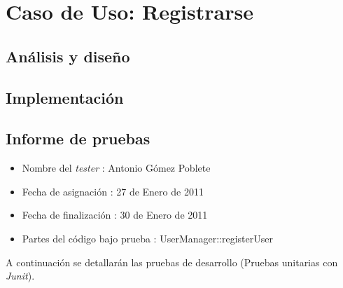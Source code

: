 \section{Caso de Uso: Registrarse}

\subsection*{Análisis y diseño}

\subsection*{Implementación}

\subsection*{Informe de pruebas}


\begin{itemize}
\item Nombre del \textit{tester} : Antonio Gómez Poblete
\item Fecha de asignación :  27 de Enero de 2011 
\item Fecha de finalización : 30 de Enero de 2011
\item Partes del código bajo prueba : UserManager::registerUser
\end{itemize}

A continuación se detallarán las pruebas de desarrollo (Pruebas unitarias con \textit{Junit}).

